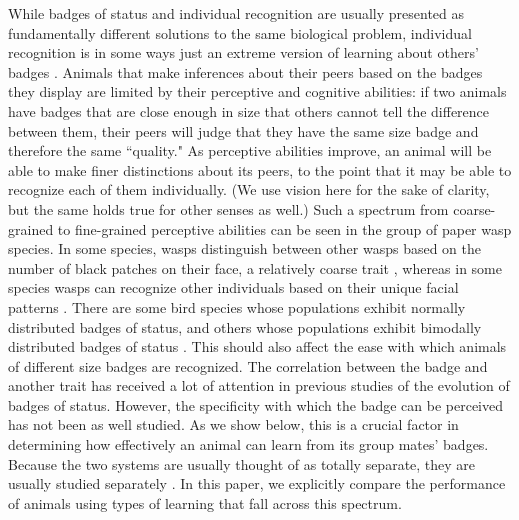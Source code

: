 While badges of status and individual recognition are usually presented as fundamentally different solutions to the same biological problem, individual recognition is in some ways just an extreme version of learning about others' badges \cite{Barnard:1979fk}. Animals that make inferences about their peers based on the badges they display are limited by their perceptive and cognitive abilities: if two animals have badges that are close enough in size that others cannot tell the difference between them, their peers will judge that they have the same size badge and therefore the same ``quality." As perceptive abilities improve, an animal will be able to make finer distinctions about its peers, to the point that it may be able to recognize each of them individually. (We use vision here for the sake of clarity, but the same holds true for other senses as well.) Such a spectrum from coarse-grained to fine-grained perceptive abilities can be seen in the group of paper wasp species. In some species, wasps distinguish between other wasps based on the number of black patches on their face, a relatively coarse trait \cite{Tibbetts:2004kx}, whereas in some species wasps can recognize other individuals based on their unique facial patterns \cite{Tibbetts:2002ys}. There are some bird species whose populations exhibit normally distributed badges of status, and others whose populations exhibit bimodally distributed badges of status \cite{Ripoll:2004vn}. This should also affect the ease with which animals of different size badges are recognized.
The correlation between the badge and another trait has received a lot of attention in previous studies of the evolution of badges of status. However, the specificity with which the badge can be perceived has not been as well studied. As we show below, this is a crucial factor in determining how effectively an animal can learn from its group mates' badges. Because the two systems are usually thought of as totally separate, they are usually studied separately \cite{sheehan2016evotradeoff}. In this paper, we explicitly compare the performance of animals using types of learning that fall across this spectrum.


